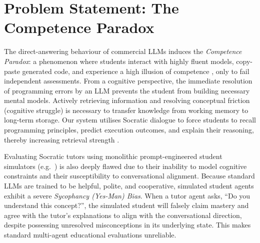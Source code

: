 \section{Problem Statement: The Competence Paradox}
The direct-answering behaviour of commercial LLMs induces the \textit{Competence Paradox}: a phenomenon where students interact with highly fluent models, copy-paste generated code, and experience a high illusion of competence \cite{prather2024widening}, only to fail independent assessments. From a cognitive perspective, the immediate resolution of programming errors by an LLM prevents the student from building necessary mental models. Actively retrieving information and resolving conceptual friction (cognitive struggle) is necessary to transfer knowledge from working memory to long-term storage. Our system utilises Socratic dialogue to force students to recall programming principles, predict execution outcomes, and explain their reasoning, thereby increasing retrieval strength \cite{roediger2006test}.

Evaluating Socratic tutors using monolithic prompt-engineered student simulators (e.g.~\cite{markel2023gpteach, xu2024eduagent}) is also deeply flawed due to their inability to model cognitive constraints and their susceptibility to conversational alignment. Because standard LLMs are trained to be helpful, polite, and cooperative, simulated student agents exhibit a severe \textit{Sycophancy (Yes-Man) Bias}. When a tutor agent asks, ``Do you understand this concept?'', the simulated student will falsely claim mastery and agree with the tutor's explanations to align with the conversational direction, despite possessing unresolved misconceptions in its underlying state. This makes standard multi-agent educational evaluations unreliable.

